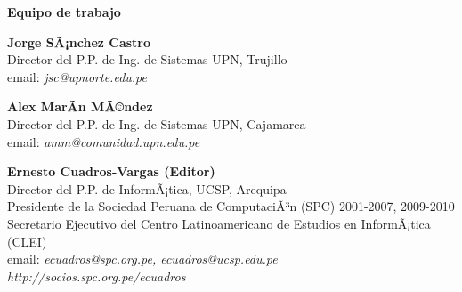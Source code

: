 \begin{center}
{\bf \Huge Equipo de trabajo}
\end{center}
\vspace{1cm}

\begin{center}
\textbf{Jorge SÃ¡nchez Castro}\\
Director del P.P. de Ing. de Sistemas UPN, Trujillo\\
email: \textit{jsc@upnorte.edu.pe}\\
\end{center}

\begin{center}
\textbf{Alex MarÃ­n MÃ©ndez}\\
Director del P.P. de Ing. de Sistemas UPN, Cajamarca\\
email: \textit{amm@comunidad.upn.edu.pe}\\
\end{center}


\begin{center}
\textbf{Ernesto Cuadros-Vargas (Editor)}\\
Director del P.P. de InformÃ¡tica, UCSP, Arequipa\\ %
Presidente de la Sociedad Peruana de ComputaciÃ³n (SPC) 2001-2007, 2009-2010\\
Secretario Ejecutivo del Centro Latinoamericano de Estudios en InformÃ¡tica (CLEI)\\
email: \textit{ecuadros@spc.org.pe, ecuadros@ucsp.edu.pe}\\
\textit{http://socios.spc.org.pe/ecuadros}
\end{center}


